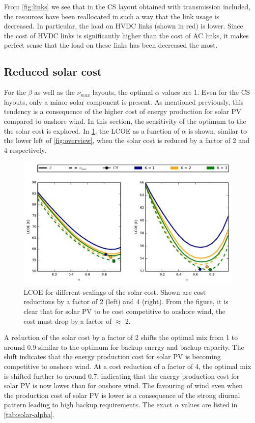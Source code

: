 \documentclass[a4paper, 5p, sort&compress]{elsarticle}%
\begin{document}
From \cref{fig:links} we see that in the CS layout obtained with
transmission included, the resources have been reallocated in such a
way that the link usage is decreased. In particular, the load on HVDC
links (shown in red) is lower. Since the cost of HVDC links is
significantly higher than the cost of AC links, it makes perfect sense
that the load on these links has been decreased the most.

\subsection{Reduced solar cost}
\label{sec:reduced-solar-cost}

For the $\beta$ as well as the $\nu_{max}$ layouts, the optimal
$\alpha$ values are 1. Even for the CS layouts, only a minor solar
component is present. As mentioned previously, this tendency is a
consequence of the higher cost of energy production for solar PV
compared to onshore wind. In this section, the sensitivity of the
optimum to the the solar cost is explored. In \cref{fig:red-solar}, the
LCOE as a function of $\alpha$ is shown, similar to the lower left of
\cref{fig:overview}, when the solar cost is reduced by a factor of 2
and 4 respectively.

\begin{figure}[p]
  \centering
  \includegraphics[width = 2\columnwidth]{solarAnalysis}
  \caption{LCOE for different scalings of the solar cost. Shown are
    cost reductions by a factor of 2 (left) and 4 (right). From the
    figure, it is clear that for solar PV to be cost competitive to
    onshore wind, the cost must drop by a factor of
    $\approx$ 2.}
  \label{fig:red-solar}
\end{figure}

A reduction of the solar cost by a factor of 2 shifts the optimal mix
from 1 to around 0.9 similar to the optimum for backup energy and
backup capacity. The shift indicates that the energy production cost
for solar PV is becoming competitive to onshore wind. At a cost
reduction of a factor of 4, the optimal mix is shifted further to
around 0.7, indicating that the energy production cost for solar PV is
now lower than for onshore wind. The favouring of wind even when the
production cost of solar PV is lower is a consequence of the strong
diurnal pattern leading to high backup requirements. The exact
$\alpha$ values are listed in \cref{tab:solar-alpha}.
\end{document}
